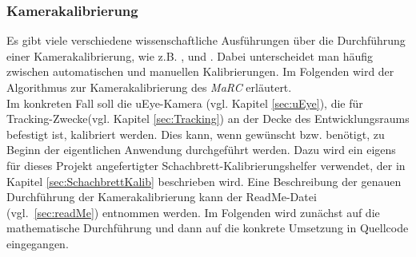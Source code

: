 \subsubsection{Kamerakalibrierung}\label{sec:camCalib}

Es gibt viele verschiedene wissenschaftliche Ausführungen über die Durchführung einer Kamerakalibrierung, wie z.B. \cite{5982395}, \cite{888718} und \cite{faugeras1993three}. Dabei unterscheidet man häufig zwischen automatischen und manuellen Kalibrierungen. Im Folgenden wird der Algorithmus zur Kamerakalibrierung des \textit{MaRC} erläutert.  \\
Im konkreten Fall soll die uEye-Kamera (vgl. Kapitel \ref{sec:uEye}), die für Tracking-Zwecke(vgl. Kapitel \ref{sec:Tracking}) an der Decke des Entwicklungsraums befestigt ist, kalibriert werden. Dies kann, wenn gewünscht bzw. benötigt, zu Beginn der eigentlichen Anwendung durchgeführt werden. Dazu wird ein eigens für dieses Projekt angefertigter Schachbrett-Kalibrierungshelfer verwendet, der in Kapitel \ref{sec:SchachbrettKalib} beschrieben wird. Eine Beschreibung der genauen Durchführung der Kamerakalibrierung kann der ReadMe-Datei (vgl.~\ref{sec:readMe}) entnommen werden. Im Folgenden wird zunächst auf die mathematische Durchführung und dann auf die konkrete Umsetzung in Quellcode eingegangen.\\

